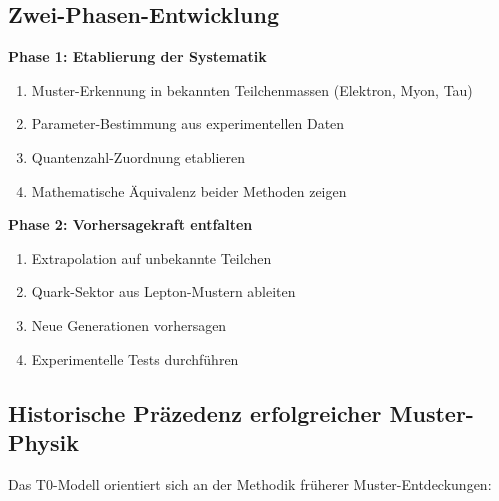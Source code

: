 	\subsection{Zwei-Phasen-Entwicklung}
	\label{subsec:zwei_phasen}
	
	\textbf{Phase 1: Etablierung der Systematik}
	\begin{enumerate}
		\item Muster-Erkennung in bekannten Teilchenmassen (Elektron, Myon, Tau)
		\item Parameter-Bestimmung aus experimentellen Daten
		\item Quantenzahl-Zuordnung etablieren
		\item Mathematische Äquivalenz beider Methoden zeigen
	\end{enumerate}
	
	\textbf{Phase 2: Vorhersagekraft entfalten}
	\begin{enumerate}
		\item Extrapolation auf unbekannte Teilchen
		\item Quark-Sektor aus Lepton-Mustern ableiten
		\item Neue Generationen vorhersagen
		\item Experimentelle Tests durchführen
	\end{enumerate}
	
	\subsection{Historische Präzedenz erfolgreicher Muster-Physik}
	\label{subsec:historische_praezedenz}
	
	Das T0-Modell orientiert sich an der Methodik früherer Muster-Entdeckungen:
	
	\begin{table}[H]
		\centering
		\caption{Historische Präzedenz der Muster-Physik}
		\label{tab:historische_praezedenz}
	\end{table}
	
